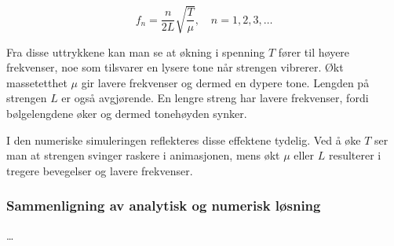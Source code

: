 \begin{equation*}
f_n = \frac{n}{2L} \sqrt{\frac{T}{\mu}}, \quad n=1,2,3,\ldots
\end{equation*}

Fra disse uttrykkene kan man se at økning i spenning \( T \) fører til høyere frekvenser, noe som tilsvarer en lysere tone når strengen vibrerer. Økt massetetthet \( \mu \) gir lavere frekvenser og dermed en dypere tone. Lengden på strengen \( L \) er også avgjørende. En lengre streng har lavere frekvenser, fordi bølgelengdene øker og dermed tonehøyden synker.

I den numeriske simuleringen reflekteres disse effektene tydelig. Ved å øke \( T \) ser man at strengen svinger raskere i animasjonen, mens økt \( \mu \) eller \( L \) resulterer i tregere bevegelser og lavere frekvenser.




\subsubsection{Sammenligning av analytisk og numerisk løsning}
\dots